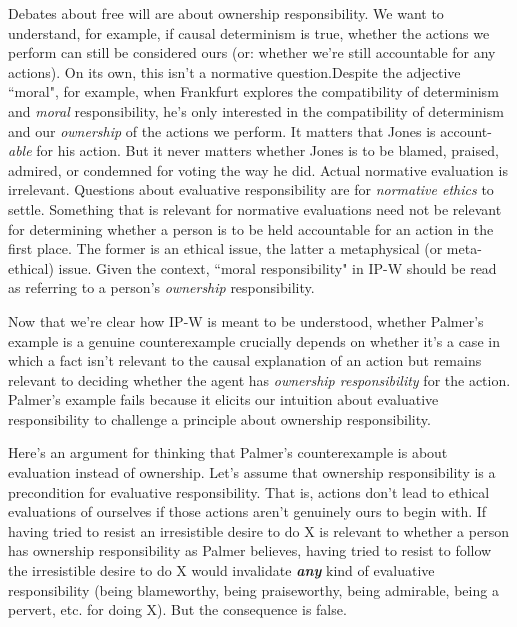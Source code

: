 \documentclass[a4paper,12pt]{article}
\begin{document}

Debates about free will are about ownership responsibility. We want to understand, for example, if causal determinism is true, whether the actions we perform can still be considered ours (or: whether we're still accountable for any actions). On its own, this isn't a normative question.\footnotemark Despite the adjective ``moral", for example, when Frankfurt explores the compatibility of determinism and \emph{moral} responsibility, he's only interested in the compatibility of determinism and our \emph{ownership} of the actions we perform. It matters that Jones is account-\emph{able} for his action. But it never matters whether Jones is to be blamed, praised, admired, or condemned for voting the way he did. Actual normative evaluation is irrelevant. Questions about evaluative responsibility are for \emph{normative ethics} to settle. Something that is relevant for normative evaluations need not be relevant for determining whether a person is to be held accountable for an action in the first place. The former is an ethical issue, the latter a metaphysical (or meta-ethical) issue. Given the context, ``moral responsibility" in IP-W should be read as referring to a person's \emph{ownership} responsibility.


Now that we're clear how IP-W is meant to be understood, whether Palmer's example is a genuine counterexample crucially depends on whether it's a case in which a fact isn't relevant to the causal explanation of an action but remains relevant to deciding whether the agent has \emph{ownership responsibility} for the action. Palmer's example fails because it elicits our intuition about evaluative responsibility to challenge a principle about ownership responsibility.

Here's an argument for thinking that Palmer's counterexample is about evaluation instead of ownership. Let's assume that ownership responsibility is a precondition for evaluative responsibility. That is, actions don't lead to ethical evaluations of ourselves if those actions aren't genuinely ours to begin with. If having tried to resist an irresistible desire to do X is relevant to whether a person has ownership responsibility as Palmer believes, having tried to resist to follow the irresistible desire to do X would invalidate \emph{\textbf{any}} kind of evaluative responsibility (being blameworthy, being praiseworthy, being admirable, being a pervert, etc. for doing X). But the consequence is false.
\end{document}

